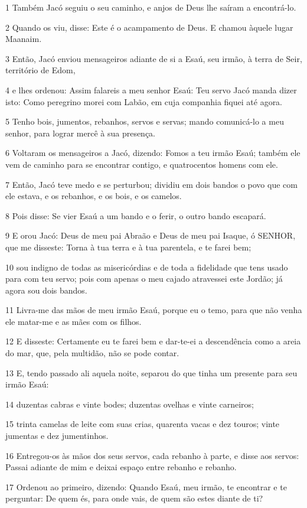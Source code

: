 \par 1 Também Jacó seguiu o seu caminho, e anjos de Deus lhe saíram a encontrá-lo.
\par 2 Quando os viu, disse: Este é o acampamento de Deus. E chamou àquele lugar Maanaim.
\par 3 Então, Jacó enviou mensageiros adiante de si a Esaú, seu irmão, à terra de Seir, território de Edom,
\par 4 e lhes ordenou: Assim falareis a meu senhor Esaú: Teu servo Jacó manda dizer isto: Como peregrino morei com Labão, em cuja companhia fiquei até agora.
\par 5 Tenho bois, jumentos, rebanhos, servos e servas; mando comunicá-lo a meu senhor, para lograr mercê à sua presença.
\par 6 Voltaram os mensageiros a Jacó, dizendo: Fomos a teu irmão Esaú; também ele vem de caminho para se encontrar contigo, e quatrocentos homens com ele.
\par 7 Então, Jacó teve medo e se perturbou; dividiu em dois bandos o povo que com ele estava, e os rebanhos, e os bois, e os camelos.
\par 8 Pois disse: Se vier Esaú a um bando e o ferir, o outro bando escapará.
\par 9 E orou Jacó: Deus de meu pai Abraão e Deus de meu pai Isaque, ó SENHOR, que me disseste: Torna à tua terra e à tua parentela, e te farei bem;
\par 10 sou indigno de todas as misericórdias e de toda a fidelidade que tens usado para com teu servo; pois com apenas o meu cajado atravessei este Jordão; já agora sou dois bandos.
\par 11 Livra-me das mãos de meu irmão Esaú, porque eu o temo, para que não venha ele matar-me e as mães com os filhos.
\par 12 E disseste: Certamente eu te farei bem e dar-te-ei a descendência como a areia do mar, que, pela multidão, não se pode contar.
\par 13 E, tendo passado ali aquela noite, separou do que tinha um presente para seu irmão Esaú:
\par 14 duzentas cabras e vinte bodes; duzentas ovelhas e vinte carneiros;
\par 15 trinta camelas de leite com suas crias, quarenta vacas e dez touros; vinte jumentas e dez jumentinhos.
\par 16 Entregou-os às mãos dos seus servos, cada rebanho à parte, e disse aos servos: Passai adiante de mim e deixai espaço entre rebanho e rebanho.
\par 17 Ordenou ao primeiro, dizendo: Quando Esaú, meu irmão, te encontrar e te perguntar: De quem és, para onde vais, de quem são estes diante de ti?
